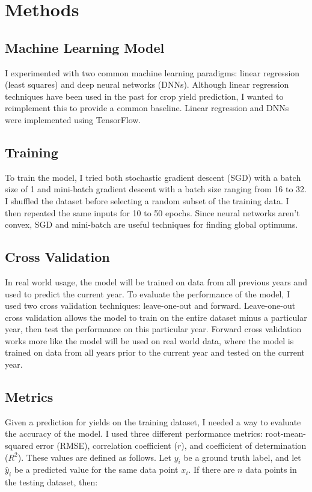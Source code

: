 \documentclass[letterpaper]{article}
\begin{document}
\section{Methods}

\subsection{Machine Learning Model}

I experimented with two common machine learning paradigms: linear regression (least squares) and deep neural networks (DNNs). Although linear regression techniques have been used in the past for crop yield prediction, I wanted to reimplement this to provide a common baseline. Linear regression and DNNs were implemented using TensorFlow.

\subsection{Training}

To train the model, I tried both stochastic gradient descent (SGD) with a batch size of 1 and mini-batch gradient descent with a batch size ranging from 16 to 32. I shuffled the dataset before selecting a random subset of the training data. I then repeated the same inputs for 10 to 50 epochs. Since neural networks aren't convex, SGD and mini-batch are useful techniques for finding global optimums.

\subsection{Cross Validation}

In real world usage, the model will be trained on data from all previous years and used to predict the current year. To evaluate the performance of the model, I used two cross validation techniques: leave-one-out and forward. Leave-one-out cross validation allows the model to train on the entire dataset minus a particular year, then test the performance on this particular year. Forward cross validation works more like the model will be used on real world data, where the model is trained on data from all years prior to the current year and tested on the current year.

\subsection{Metrics}

Given a prediction for yields on the training dataset, I needed a way to evaluate the accuracy of the model. I used three different performance metrics: root-mean-squared error (RMSE), correlation coefficient ($r$), and coefficient of determination ($R^2$). These values are defined as follows. Let $y_i$ be a ground truth label, and let $\hat{y}_i$ be a predicted value for the same data point $x_i$. If there are $n$ data points in the testing dataset, then:
\end{document}
